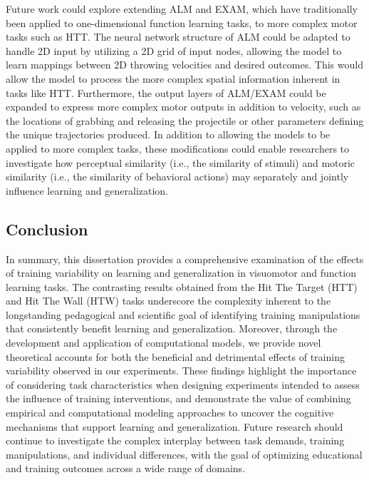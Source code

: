 \documentclass[
  11pt,
  letterpaper,
]{article}
\begin{document}
Future work could explore extending ALM and EXAM, which have
traditionally been applied to one-dimensional function learning tasks,
to more complex motor tasks such as HTT. The neural network structure of
ALM could be adapted to handle 2D input by utilizing a 2D grid of input
nodes, allowing the model to learn mappings between 2D throwing
velocities and desired outcomes. This would allow the model to process
the more complex spatial information inherent in tasks like HTT.
Furthermore, the output layers of ALM/EXAM could be expanded to express
more complex motor outputs in addition to velocity, such as the
locations of grabbing and releasing the projectile or other parameters
defining the unique trajectories produced. In addition to allowing the
models to be applied to more complex tasks, these modifications could
enable researchers to investigate how perceptual similarity (i.e., the
similarity of stimuli) and motoric similarity (i.e., the similarity of
behavioral actions) may separately and jointly influence learning and
generalization.

\subsection{Conclusion}\label{conclusion-1}

In summary, this dissertation provides a comprehensive examination of
the effects of training variability on learning and generalization in
visuomotor and function learning tasks. The contrasting results obtained
from the Hit The Target (HTT) and Hit The Wall (HTW) tasks underscore
the complexity inherent to the longstanding pedagogical and scientific
goal of identifying training manipulations that consistently benefit
learning and generalization. Moreover, through the development and
application of computational models, we provide novel theoretical
accounts for both the beneficial and detrimental effects of training
variability observed in our experiments. These findings highlight the
importance of considering task characteristics when designing
experiments intended to assess the influence of training interventions,
and demonstrate the value of combining empirical and computational
modeling approaches to uncover the cognitive mechanisms that support
learning and generalization. Future research should continue to
investigate the complex interplay between task demands, training
manipulations, and individual differences, with the goal of optimizing
educational and training outcomes across a wide range of domains.
\end{document}
